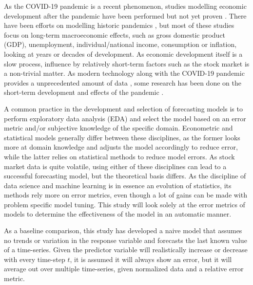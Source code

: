 As the COVID-19 pandemic is a recent phenomenon, studies modelling economic development after the pandemic have been performed but not yet proven \cite{chudik2020economic, baldwin2020economics, fernandes2020economic}. There have been efforts on modelling historic pandemics \cite{osterholm2017preparing, correia1918pandemics, jorda2020longer}, but most of these studies focus on long-term macroeconomic effects, such as gross domestic product (GDP), unemployment, individual/national income, consumption or inflation, looking at years or decades of development. As economic development itself is a slow process, influence by relatively short-term factors such as the stock market is a non-trivial matter. As modern technology along with the COVID-19 pandemic provides a unprecedented amount of data \cite{dong2020interactive, hale2020variation}, some research has been done on the short-term development and effects of the pandemic \cite{zhao2020preliminary, deb2020economic, carpi2021twitter}.


A common practice in the development and selection of forecasting models is to perform exploratory data analysis (EDA) and select the model based on an error metric and/or subjective knowledge of the specific domain. Econometric and statistical models generally differ between these disciplines, as the former looks more at domain knowledge and adjusts the model accordingly to reduce error, while the latter relies on statistical methods to reduce model errors. As stock market data is quite volatile, using either of these disciplines can lead to a successful forecasting model, but the theoretical basis differs. As the discipline of data science and machine learning is in essence an evolution of statistics, its methods rely more on error metrics, even though a lot of gains can be made with problem specific model tuning. This study will look solely at the error metrics of models to determine the effectiveness of the model in an automatic manner.

As a baseline comparison, this study has developed a naive model that assumes no trends or variation in the response variable and forecasts the last known value of a time-series. Given the predictor variable will realistically increase or decrease with every time-step $t$, it is assumed it will always show an error, but it will average out over multiple time-series, given normalized data and a relative error metric.

